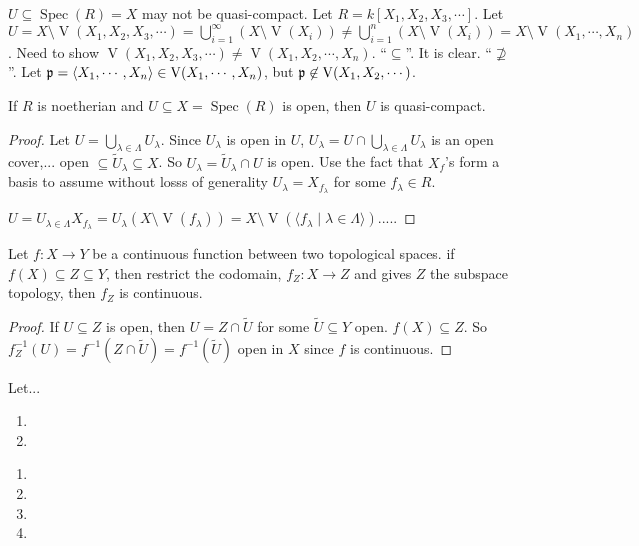 \begin{example}
    $U \subseteq \operatorname{Spec}(R) = X$ may not be quasi-compact. Let $R = k[X_1,X_2,X_3,\cdots]$. Let $U = X \setminus \operatorname{V}(X_1,X_2,X_3,\cdots) = \bigcup_{i=1}^\infty (X \setminus \operatorname{V}(X_i)) \neq \bigcup_{i=1}^n (X \setminus \operatorname{V}(X_i)) = X \setminus \operatorname{V}(X_1,\cdots,X_n)$. Need to show $\operatorname{V}(X_1,X_2,X_3,\cdots) \neq \operatorname{V}(X_1,X_2,\cdots,X_n)$. ``$\subseteq$''. It is clear. ``$\not \supseteq$''. Let $\mathfrak{p} = \langle X_1,\cdots,X_n \rangle \in \operatorname{V}(X_1,\cdots,X_n)$, but $\mathfrak{p} \not \in \operatorname{V}(X_1,X_2,\cdots)$.
\end{example}

\begin{fact}
    If $R$ is noetherian and $U \subseteq X = \operatorname{Spec}(R)$ is open, then $U$ is quasi-compact. 
\end{fact}

\begin{proof}
    Let $U = \bigcup_{\lambda \in \Lambda}U_\lambda$. Since $U_\lambda$ is open in $U$, $U_\lambda = U \cap \bigcup_{\lambda \in \Lambda}U_\lambda$ is an open cover,... open $\subseteq \widetilde U_\lambda \subseteq X$. So $U_\lambda = \widetilde U_\lambda \cap U$ is open. Use the fact that $X_f$'s form a basis to assume without losss of generality $U_\lambda = X_{f_\lambda}$ for some $f_\lambda \in R$. \par 
    $U = U_{\lambda \in \Lambda} X_{f_\lambda} = U_\lambda (X \setminus \operatorname{V}(f_\lambda)) = X \setminus \operatorname{V}(\langle f_\lambda \mid \lambda \in \Lambda \rangle)$..... \par 
\end{proof}

\begin{lemma}
    Let $f: X \to Y$ be a continuous function between two topological spaces. if $f(X) \subseteq Z \subseteq Y$, then restrict the codomain, $f_Z: X \to Z$ and gives $Z$ the subspace topology, then $f_Z$ is continuous.
\end{lemma}

\begin{proof}
    If $U \subseteq Z$ is open, then $U = Z \cap \widetilde U$ for some $\widetilde U \subseteq Y$ open. $f(X) \subseteq Z$. So $f_Z^{-1}(U) = f^{-1}(Z \cap \widetilde U) = f^{-1}(\widetilde U)$ open in $X$ since $f$ is continuous.
\end{proof}

\begin{theorem}
    Let...
    \begin{enumerate}
        \item
        \item 
    \end{enumerate}
\end{theorem}

\begin{corollary}
    \begin{enumerate}
        \item 
        \item 
        \item 
        \item 
    \end{enumerate}
\end{corollary}
